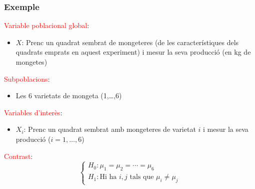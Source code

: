 \documentclass[12pt,t]{beamer}
\newcommand{\red}[1]{\textcolor{red}{#1}}
\theoremstyle{plain}
\theoremstyle{definition}
\begin{document}
\begin{frame}
\frametitle{Exemple}

\red{Variable poblacional global}: 
\begin{itemize}
\item $X$: Prenc un quadrat sembrat de mongeteres (de les característiques dels quadrats emprats en aquest experiment) i mesur la seva producció (en kg de mongetes)\medskip
\end{itemize}

\red{Subpoblacions}: 
\begin{itemize}
\item Les 6 varietats de mongeta (1,\ldots,6)\medskip
\end{itemize}

\red{Variables d'interès}: 
\begin{itemize}
\item $X_i$: Prenc un quadrat sembrat amb mongeteres de varietat $i$ i mesur la seva producció ($i=1,\ldots,6$)
\end{itemize}

\red{Contrast}: 
$$
\left\{
\begin{array}{l}
H_0 : \mu_1=\mu_{2}=\cdots=\mu_{6} \\
H_1 : \mbox{Hi ha  }i,j\mbox{ tals que }  \mu_i \not=\mu_j
\end{array}
\right.
$$
\end{frame}
\end{document}
